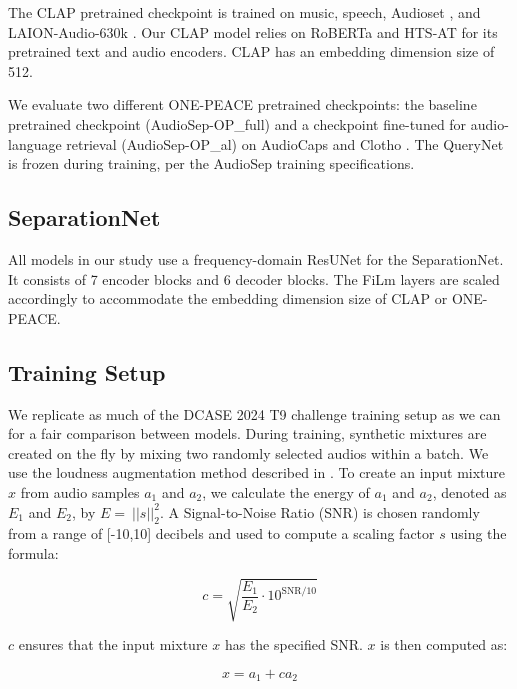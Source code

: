 \documentclass[11pt]{article}
\begin{document}
The CLAP pretrained checkpoint is trained on music, speech, Audioset \cite{audioset}, and LAION-Audio-630k \cite{clap}. Our CLAP model relies on RoBERTa \cite{roberta} and HTS-AT \cite{htsat} for its pretrained text and audio encoders. CLAP has an embedding dimension size of 512.

We evaluate two different ONE-PEACE pretrained checkpoints: the baseline pretrained checkpoint (AudioSep-OP\_full) and a checkpoint fine-tuned for audio-language retrieval (AudioSep-OP\_al) on AudioCaps \cite{audiocaps} and Clotho \cite{clotho}. The QueryNet is frozen during training, per the AudioSep training specifications.

\subsection{SeparationNet}
All models in our study use a frequency-domain ResUNet \cite{resunet} for the SeparationNet. It consists of 7 encoder blocks and 6 decoder blocks. The FiLm layers are scaled accordingly to accommodate the embedding dimension size of CLAP or ONE-PEACE. 

\subsection{Training Setup}
We replicate as much of the DCASE 2024 T9 challenge training setup as we can for a fair comparison between models. During training, synthetic mixtures are created on the fly by mixing two randomly selected audios within a batch. We use the loudness augmentation method described in \cite{kong2023universal}. To create an input mixture $x$ from audio samples $a_1$ and $a_2$, we calculate the energy of $a_1$ and $a_2$, denoted as $E_1$ and $E_2$, by $E = \ \left\vert\vert s \vert\right\vert^2_2 $. A Signal-to-Noise Ratio (SNR) is chosen randomly from a range of [-10,10] decibels and used to compute a scaling factor $s$ using the formula:

\begin{equation}
  \label{eq:scale}
  c = \sqrt{\frac{E_1}{E_2} \cdot 10^{\text{SNR}/10}}
\end{equation}

\noindent $c$ ensures that the input mixture $x$ has the specified SNR. $x$ is then computed as:

\begin{equation}
    \label{mixture}
    x = a_1 + c a_2
\end{equation}
\end{document}
